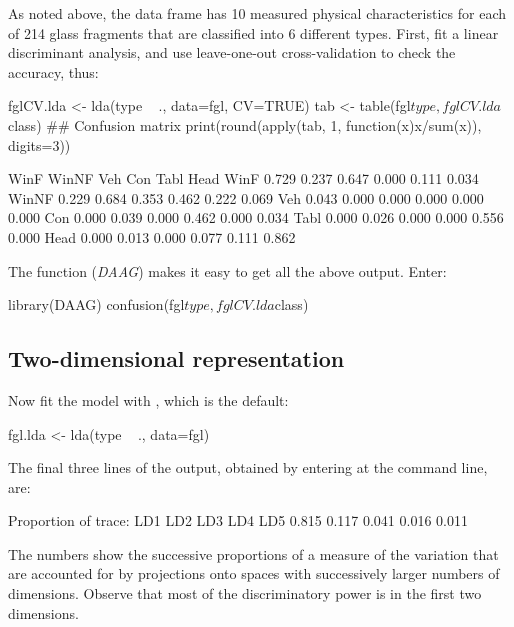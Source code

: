 As noted above, the data frame  has 10 measured physical
characteristics for each of 214 glass fragments that are classified
into 6 different types.  First, fit a linear discriminant analysis,
and use leave-one-out cross-validation to check the accuracy, thus:
\begin{Schunk}
\begin{Sinput}
fglCV.lda <- lda(type ~ ., data=fgl, CV=TRUE)
tab <- table(fgl$type, fglCV.lda$class)
## Confusion matrix
print(round(apply(tab, 1, function(x)x/sum(x)),
            digits=3))
\end{Sinput}
\begin{Soutput}
       
         WinF WinNF   Veh   Con  Tabl  Head
  WinF  0.729 0.237 0.647 0.000 0.111 0.034
  WinNF 0.229 0.684 0.353 0.462 0.222 0.069
  Veh   0.043 0.000 0.000 0.000 0.000 0.000
  Con   0.000 0.039 0.000 0.462 0.000 0.034
  Tabl  0.000 0.026 0.000 0.000 0.556 0.000
  Head  0.000 0.013 0.000 0.077 0.111 0.862
\end{Soutput}
\end{Schunk}

The function  (\textit{DAAG}) makes it easy to
get all the above output.  Enter:
\begin{Schunk}
\begin{Sinput}
library(DAAG)
confusion(fgl$type, fglCV.lda$class)
\end{Sinput}
\end{Schunk}

\subsection*{Two-dimensional representation}

Now fit the model with , which is the default:
\begin{Schunk}
\begin{Sinput}
fgl.lda <- lda(type ~ ., data=fgl)
\end{Sinput}
\end{Schunk}
The final three lines of the output, obtained by entering
 at the command line, are:
\begin{Schunk}
\begin{Soutput}
Proportion of trace:
  LD1   LD2   LD3   LD4   LD5
0.815 0.117 0.041 0.016 0.011
\end{Soutput}
\end{Schunk}
The numbers show the successive proportions of a measure of the
variation that are accounted for by projections onto spaces with
successively larger numbers of dimensions.  Observe that most of the
discriminatory power is in the first two dimensions.

